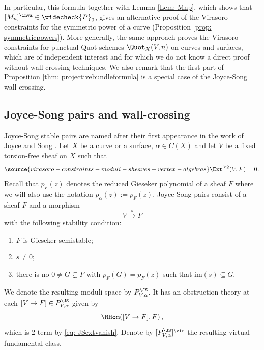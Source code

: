 In particular, this formula together with Lemma \ref{Lem: Mnp}, which shows that $[M_{n}]^\inva\in \widecheck{P}_0$, gives an alternative proof of the Virasoro constraints for the symmetric power of a curve (Proposition \ref{prop: symmetricpowers}). More generally, the same approach proves the Virasoro constraints for punctual Quot schemes $\Quot_X(V,n)$ on curves and surfaces, which are of independent interest and for which we do not know a direct proof without wall-crossing techniques. We also remark that the first part of Proposition \ref{thm: projectivebundleformula} is a special case of the Joyce-Song wall-crossing.


\subsection{Joyce-Song pairs and wall-crossing}

\label{sec: joycesong}
Joyce-Song stable pairs are named after their first appearance in the work of Joyce and Song \cite[Section 12.1]{JS12}. Let $X$ be a curve or a surface, $\alpha\in C(X)$ and let $V$ be a fixed torsion-free sheaf on $X$ such that
\begin{equation}\label{eq: JSextvanish}
\source{virasoro-constraints-moduli-sheaves-vertex-algebras}
\Ext^{\geq 2}(V,F)=0\,.
\end{equation}
Recall that $p_F(z)$ denotes the reduced Gieseker polynomial of a sheaf $F$ where we will also use the notation $p_{\alpha}(z):=p_F(z)$. Joyce-Song pairs consist of a sheaf $F$ and a morphism
$$
V \xrightarrow{s} F
$$
with the following stability condition:
\begin{enumerate}
    \item $F$ is Gieseker-semistable;
    \item $s\neq 0$;
    \item there is no $0\neq G\subsetneq F$ with $p_F(G)=p_F(z)$ such that $\mathrm{im}(s)\subseteq G$.
\end{enumerate}

We denote the resulting moduli space by $P^{\JS}_{V,\alpha}$. It has an obstruction theory at each $[V\to F]\in P^{\JS}_{V,\alpha}$ given by
$$
\RHom([V\to F], F)\,,
$$
which is 2-term by \eqref{eq: JSextvanish}. Denote by
$[P^{\JS}_{V,\alpha}]^\vir$ the resulting virtual fundamental class.


